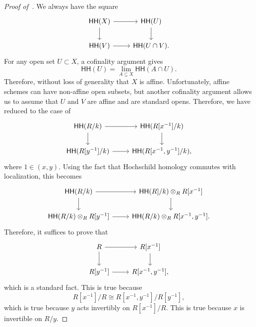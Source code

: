 \documentclass[10pt]{amsart}
\theoremstyle{definition}
\theoremstyle{remark}
\theoremstyle{plain}
\theoremstyle{definition}
\theoremstyle{remark}
\newcommand{\ms}[1]{\mathsf{#1}}
\newcommand{\1}{\mathbf{1}}
\newcommand{\2}{\mathbf{2}}
\newcommand{\3}{\mathbf{3}}
\newcommand{\HH}{\ms{HH}}
\begin{document}
\begin{proof}[Proof of~]
    We always have the square
    \begin{equation*}
        \begin{tikzcd}
            \HH(X) \ar{r} \ar{d} & \HH(U) \ar{d} \\
            \HH(V) \ar{r} & \HH(U \cap V).
        \end{tikzcd}
        \end{equation*}
        For any open set $U \subset X$, a cofinality argument gives
        \[ \HH(U) = \lim_{A \subseteq X} \HH(A \cap U). \]
        Therefore, without loss of generality that $X$ is affine. Unfortunately, affine schemes can have non-affine open subsets, but another cofinality argument allows us to assume that $U$ and $V$ are affine and are standard opens. Therefore, we have reduced to the case of
        \begin{equation*}
        \begin{tikzcd}
            \HH(R/k) \ar{r} \ar{d} & \HH(R[x^{-1}]/k) \ar{d} \\
            \HH(R[y^{-1}]/k) \ar{r} & \HH(R[x^{-1}, y^{-1}]/k),
        \end{tikzcd}
        \end{equation*}
        where $1 \in (x,y)$. Using the fact that Hochschild homology commutes with localization, this becomes
        \begin{equation*}
            \begin{tikzcd}
                \HH(R/k) \ar{r} \ar{d} & \HH(R]/k) \otimes_R R[x^{-1}] \ar{d} \\
                \HH(R/k) \otimes_R R[y^{-1}] \ar{r} & \HH(R/k) \otimes_R R[x^{-1}, y^{-1}].
            \end{tikzcd}
        \end{equation*}
        Therefore, it suffices to prove that
        \begin{equation*}
        \begin{tikzcd}
            R \ar{r} \ar{d} & R[x^{-1}] \ar{d} \\
            R[y^{-1}] \ar{r} & R[x^{-1}, y^{-1}],
        \end{tikzcd}
        \end{equation*}
        which is a standard fact. This is true because
        \[ R[x^{-1}]/R \cong R[x^{-1}, y^{-1}]/ R[y^{-1}], \]
        which is true because $y$ acts invertibly on $R[x^{-1}]/R$. This is true because $x$ is invertible on $R/y$.
\end{proof}
\end{document}
